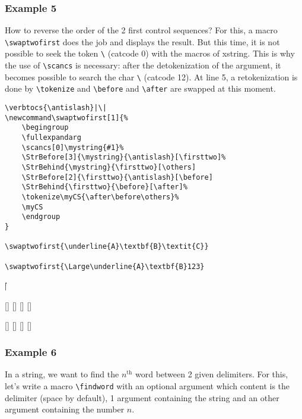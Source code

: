 \documentclass[a4paper,10pt]{article}
\renewcommand\th{${}^\text{th}$\xspace}
\newcommand\Xstring{\textsf{xstring}\xspace}
\newcommand\styleexercice{\footnotesize}
\newcommand\verbinline{\lstinline[basicstyle=\normalsize\ttfamily]}
\begin{document}
\subsubsection{Example 5}
How to reverse the order of the 2 first control sequences? For this, a macro \verb|\swaptwofirst| does the job and displays the result. But this time, it is not possible to seek the token \verb|\| (catcode 0) with the macros of \Xstring. This is why the use of \verbinline|\scancs| is necessary: after the detokenization of the argument, it becomes possible to search the char \verb|\| (catcode 12). At line 5, a retokenization is done by \verbinline|\tokenize| and \verb|\before| and \verb|\after| are swapped at this moment.\medskip

\begin{minipage}[c]{0.65\linewidth}
\begin{lstlisting}
\verbtocs{\antislash}|\|
\newcommand\swaptwofirst[1]{%
	\begingroup
	\fullexpandarg
	\scancs[0]\mystring{#1}%
	\StrBefore[3]{\mystring}{\antislash}[\firsttwo]%
	\StrBehind{\mystring}{\firsttwo}[\others]
	\StrBefore[2]{\firsttwo}{\antislash}[\before]
	\StrBehind{\firsttwo}{\before}[\after]%
	\tokenize\myCS{\after\before\others}%
	\myCS
	\endgroup
}

\swaptwofirst{\underline{A}\textbf{B}\textit{C}}

\swaptwofirst{\Large\underline{A}\textbf{B}123}
\end{lstlisting}%
\end{minipage}\hfill
\begin{minipage}[c]{0.35\linewidth}
	\styleexercice
	\verbtocs{\antislash}|\|
	\newcommand\swaptwofirst[1]{%
		\begingroup
		\fullexpandarg
		\scancs[0]\mystring{#1}%
		\StrBefore[3]{\mystring}{\antislash}[\firsttwo]%
		\StrBehind{\mystring}{\firsttwo}[\others]
		\StrBefore[2]{\firsttwo}{\antislash}[\before]
		\StrBehind{\firsttwo}{\before}[\after]%
		\tokenize\myCS{\after\before\others}%
		\myCS
		\endgroup
	}

	\swaptwofirst{\underline{A}\textbf{B}\textit{C}}

	\swaptwofirst{\Large\underline{A}\textbf{B}123}
\end{minipage}%


\subsubsection{Example 6}
In a string, we want to find the $n$\th{} word between 2 given delimiters. For this, let's write a macro \verb|\findword| with an optional argument which content is the delimiter (space by default), 1 argument containing the string and an other argument containing the number $n$.\medskip
\end{document}
